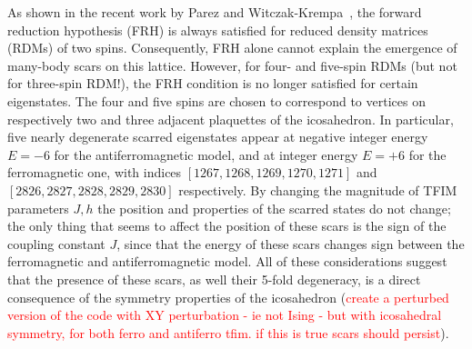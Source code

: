 \documentclass{article}
\begin{document}
As shown in the recent work by Parez and Witczak-Krempa~\cite{parez2024}, the forward reduction hypothesis (FRH) is always satisfied for reduced density matrices (RDMs) of two spins. Consequently, FRH alone cannot explain the emergence of many-body scars on this lattice. However, for four- and five-spin RDMs (but not for three-spin RDM!), the FRH condition is no longer satisfied for certain eigenstates. The four and five spins are chosen to correspond to vertices on respectively two and three adjacent plaquettes of the icosahedron. In particular, five nearly degenerate scarred eigenstates appear at negative integer energy $E = -6$ for the antiferromagnetic model, and at integer energy $E = +6$ for the ferromagnetic one, with indices $[1267,1268,1269,1270,1271]$ and $[2826,2827,2828,2829, 2830]$ respectively. By changing the magnitude of TFIM parameters $J,h$ the position and properties of the scarred states do not change; the only thing that seems to affect the position of these scars is the sign of the coupling constant $J$, since that the energy of these scars changes sign between the ferromagnetic and antiferromagnetic model. All of these considerations suggest that the presence of these scars, as well their 5-fold degeneracy, is a direct consequence of the symmetry properties of the icosahedron (\textcolor{red}{create a perturbed version of the code with XY perturbation - ie not Ising - but with icosahedral symmetry, for both ferro and antiferro tfim. if this is true scars should persist}).
\end{document}
